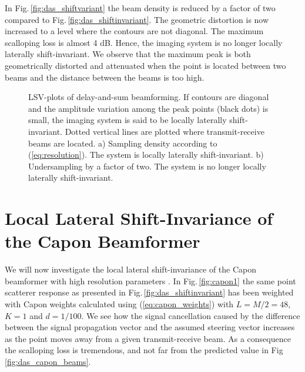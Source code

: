 \documentclass[draftcls]{IEEEtran}
\newcommand{\img}{img/}
\begin{document}
In Fig.\,\ref{fig:das_shiftvariant} the beam density is reduced by a factor of two compared to Fig.\,\ref{fig:das_shiftinvariant}. The geometric distortion is now increased to a level where the contours are not diagonal. The maximum scalloping loss is almost 4 dB. Hence, the imaging system is no longer locally laterally shift-invariant. We observe that the maximum peak is both geometrically distorted and attenuated when the point is located between two beams and the distance between the beams is too high.

\begin{figure*}[!t]
\centerline{
\hfill{}
}
\caption{LSV-plots of delay-and-sum beamforming. If contours are diagonal and the amplitude variation among the peak points (black dots) is small, the imaging system is said to be locally laterally shift-invariant. Dotted vertical lines are plotted where transmit-receive beams are located. a) Sampling density according to (\ref{eq:resolution}). The system is locally laterally shift-invariant. b) Undersampling by a factor of two. The system is no longer locally laterally shift-invariant.}
\label{fig:das}
\end{figure*}

\section{Local Lateral Shift-Invariance of the Capon Beamformer}\label{sec:capon_LLSI}
We will now investigate the local lateral shift-invariance of the Capon beamformer with high resolution parameters \cite{Synnevag2009, Asen}. In Fig.\,\ref{fig:capon1} the same point scatterer response as presented in Fig.\,\ref{fig:das_shiftinvariant} has been weighted with Capon weights calculated using (\ref{eq:capon_weights}) with $L = M/2 = 48$, $K=1$ and $d=1/100$. We see how the signal cancellation caused by the difference between the signal propagation vector and the assumed steering vector increases as the point moves away from a given transmit-receive beam. As a consequence the scalloping loss is tremendous, and not far from the predicted value in Fig\,\ref{fig:das_capon_beams}. %
\end{document}
